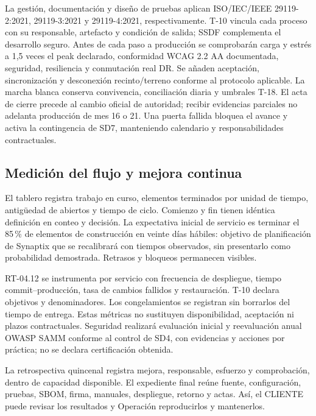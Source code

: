 La gestión, documentación y diseño de pruebas aplican ISO/IEC/IEEE 29119-2:2021, 29119-3:2021 y 29119-4:2021, respectivamente. T-10 vincula cada proceso con su responsable, artefacto y condición de salida; SSDF complementa el desarrollo seguro. Antes de cada paso a producción se comprobarán carga y estrés a 1,5 veces el peak declarado, conformidad WCAG 2.2 AA documentada, seguridad, resiliencia y conmutación real DR. Se añaden aceptación, sincronización y desconexión recinto/terreno conforme al protocolo aplicable. La marcha blanca conserva convivencia, conciliación diaria y umbrales T-18. El acta de cierre precede al cambio oficial de autoridad; recibir evidencias parciales no adelanta producción de mes 16 o 21. Una puerta fallida bloquea el avance y activa la contingencia de SD7, manteniendo calendario y responsabilidades contractuales. \parencites[art.~4.3, pp.~5--6; art.~17.3, pp.~12--13]{sd6-ba}[cap.~20, pp.~34--35]{sd6-bt}{sd6-29119-2,sd6-29119-3,sd6-29119-4}[numeral 13.3, pp.~29--30]{sd6-c07}

\subsection{Medición del flujo y mejora continua}
El tablero registra trabajo en curso, elementos terminados por unidad de tiempo, antigüedad de abiertos y tiempo de ciclo. Comienzo y fin tienen idéntica definición en conteo y decisión. La expectativa inicial de servicio es terminar el 85\,\% de elementos de construcción en veinte días hábiles: objetivo de planificación de Synaptix que se recalibrará con tiempos observados, sin presentarlo como probabilidad demostrada. Retrasos y bloqueos permanecen visibles. \parencite[Definition of Workflow y Flow Metrics, pp.~3--5]{sd6-kanban}

RT-04.12 se instrumenta por servicio con frecuencia de despliegue, tiempo commit--producción, tasa de cambios fallidos y restauración. T-10 declara objetivos y denominadores. Los congelamientos se registran sin borrarlos del tiempo de entrega. Estas métricas no sustituyen disponibilidad, aceptación ni plazos contractuales. Seguridad realizará evaluación inicial y reevaluación anual OWASP SAMM conforme al control de SD4, con evidencias y acciones por práctica; no se declara certificación obtenida. \parencites[RT-04.12, p.~11; RT-11.28, p.~24]{sd6-bt}{sd6-samm}

La retrospectiva quincenal registra mejora, responsable, esfuerzo y comprobación, dentro de capacidad disponible. El expediente final reúne fuente, configuración, pruebas, SBOM, firma, manuales, despliegue, retorno y actas. Así, el CLIENTE puede revisar los resultados y Operación reproducirlos y mantenerlos.
